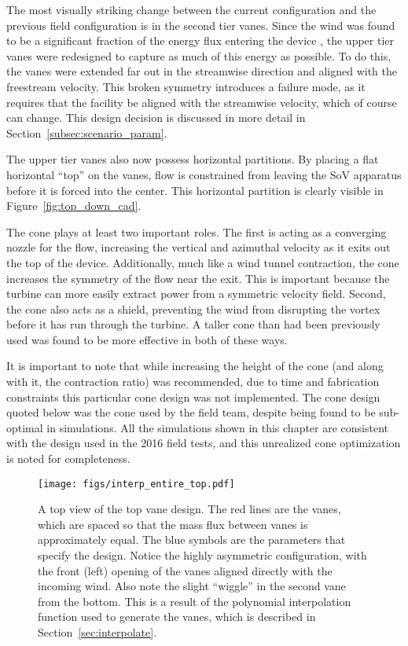 The most visually striking change between the current configuration and
the previous field configuration is in the second tier vanes. 
Since the wind was found to be a
significant fraction of the energy flux entering the device , 
 the upper tier vanes were redesigned to capture as much of this
energy as possible. To do this, the vanes were extended far out in the
streamwise direction and aligned with the freestream velocity. 
This broken symmetry introduces a failure mode, as it
requires that the facility be aligned with the streamwise velocity, which of 
course can change. This design decision is discussed in more detail in
Section~\ref{subsec:scenario_param}. 

The upper tier vanes also now possess horizontal partitions. By placing
a flat horizontal ``top'' on the vanes, flow is constrained from
leaving the SoV apparatus before it is forced into the
center. This horizontal partition is clearly visible in
Figure~\ref{fig:top_down_cad}.   

The cone plays at least two important roles. The first is acting as a
converging nozzle for the flow, increasing the vertical and azimuthal
velocity as it exits out the top of the device. Additionally, much like
a wind tunnel contraction, the cone increases the
symmetry of the flow near the exit. This is important because the turbine 
can more easily extract power from a symmetric velocity
field. 
Second, the cone also acts as a shield, preventing the wind
from disrupting the vortex before it has run through the
turbine. A taller cone than had been previously used was found 
to be more effective in both of these ways.

It is important to note that while increasing the height of the cone
(and along with it, the contraction ratio) was recommended, due to
time and fabrication constraints this particular cone design was not
implemented. The cone design quoted below was the cone used by
the field team, despite being found to be sub-optimal in
simulations. All the simulations shown in this chapter are consistent
with the design used in the 2016 field tests, and this unrealized cone
optimization is noted for completeness.

 \begin{figure}[!htb]
  \begin{center}
   \texttt{[image: figs/interp\_entire\_top.pdf]}
   \caption{A top view of the top vane design. The red lines are the
     vanes, which are spaced so that the mass flux between vanes is
     approximately equal. The blue symbols are the parameters that
     specify the design. Notice the highly asymmetric configuration,
     with the front (left) opening of the vanes aligned directly with
     the incoming wind. Also note the slight ``wiggle'' in the second
   vane from the bottom. This is a result of the polynomial
   interpolation function used to generate the vanes, which is described
   in Section~\ref{sec:interpolate}.} 
   \label{fig:top_design}
  \end{center}
 \end{figure}

